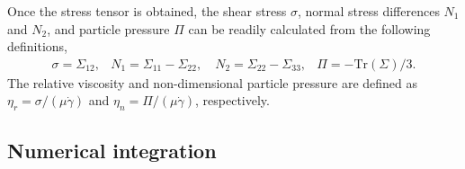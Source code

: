 Once the stress tensor is obtained, the shear stress $\sigma$, normal stress differences $N_1$ and $N_2$, and particle pressure $\Pi$ can be readily calculated from the following definitions,
\begin{subequations}
  \begin{equation} 
    \begin{aligned}
      \sigma=\mathbb{\Sigma}_{12},
    \end{aligned}
  \end{equation}
  \begin{equation} 
    \begin{aligned}
      N_1=\mathbb{\Sigma}_{11}-\mathbb{\Sigma}_{22}, \quad
      N_2=\mathbb{\Sigma}_{22}-\mathbb{\Sigma}_{33},
    \end{aligned}
  \end{equation}
  \begin{equation} 
    \begin{aligned}
      \Pi=-\textrm{Tr}(\mathbb{\Sigma})/3.
    \end{aligned}
  \end{equation}
\end{subequations}
The relative viscosity and non-dimensional particle pressure are defined as $\eta_r=\sigma/(\mu\dot{\gamma})$ and $\eta_n=\Pi/(\mu\dot{\gamma})$, respectively.


\subsection{Numerical integration}
\label{sec:numerical}

